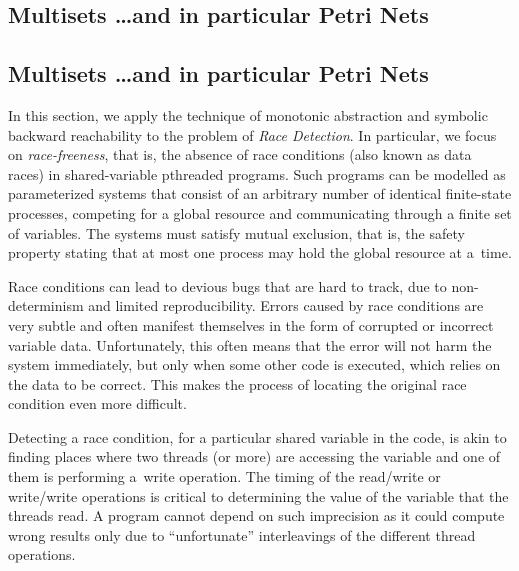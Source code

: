 \makeatletter
\if@UU@margnum
\subsection*{Multisets \ldots and in particular Petri Nets}
\else
\subsection{Multisets \ldots and in particular Petri Nets}
\fi
\makeatother
\label{section:monotonic:abstraction:applications:pn}
%
In this section, we apply the technique of monotonic abstraction and
symbolic backward reachability to the problem of \emph{Race
  Detection}.
%
In particular, we focus on \emph{race-freeness}, that is, the absence
of race conditions (also known as data races) in shared-variable
pthreaded programs.
%
Such programs can be modelled as parameterized systems that consist of
an arbitrary number of identical finite-state processes, competing for
a global resource and communicating through a finite set of variables.
%
The systems must satisfy mutual exclusion, that is, the safety
property stating that at most one process may hold the global resource
at a~time.

%
Race conditions can lead to devious bugs that are hard to track, due
to non-determinism and limited reproducibility. Errors caused by race
conditions are very subtle and often manifest themselves in the form
of corrupted or incorrect variable data. Unfortunately, this often
means that the error will not harm the system immediately, but only
when some other code is executed, which relies on the data to be
correct. This makes the process of locating the original race
condition even more difficult.%

%
%
Detecting a race condition, for a particular shared variable in the
code, is akin to finding places where two threads (or more) are
accessing the variable and one of them is performing a~write
operation. The timing of the read/write or write/write operations is
critical to determining the value of the variable that the threads read.
A program cannot depend on such imprecision as it could compute wrong
results only due to ``unfortunate'' interleavings of the different
thread operations.

